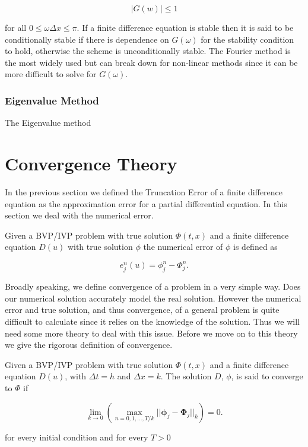 \documentclass[../main.tex]{subfiles}
\begin{document}
  \begin{equation}
    \left\vert G(w) \right\vert \leq 1
  \end{equation}

  for all $0 \leq \omega \Delta x \leq \pi$. If a finite difference equation is stable then it is said to be conditionally stable if there is dependence on $G(\omega)$ for the stability condition to hold, otherwise the scheme is unconditionally stable. The Fourier method is the most widely used but can break down for non-linear methods since it can be more difficult to solve for $G(\omega)$.

  \subsubsection{Eigenvalue Method}
  The Eigenvalue method

  \section{Convergence Theory}
  In the previous section we defined the Truncation Error of a finite difference equation as the approximation error for a partial differential equation. In this section we deal with the numerical error.

  \begin{definition}
    Given a BVP/IVP problem with true solution $\Phi(t, x)$ and a finite difference equation $D(u)$ with true solution $\phi$ the numerical error of $\phi$ is defined as

    \begin{equation}
      e^n_j(u) = \phi^n_j - \Phi^n_j.
    \end{equation}
  \end{definition}

  Broadly speaking, we define convergence of a problem in a very simple way. Does our numerical solution accurately model the real solution. However the numerical error and true solution, and thus convergence, of a general problem is quite difficult to calculate since it relies on the knowledge of the solution. Thus we will need some more theory to deal with this issue. Before we move on to this theory we give the rigorous definition of convergence.

  \begin{definition}[Convergence]
    Given a BVP/IVP problem with true solution $\Phi(t, x)$ and a finite difference equation $D(u)$, with $\Delta t = h$ and $\Delta x = k$. The solution $D$, $\phi$, is said to converge to $\Phi$ if

    \begin{equation}
      \lim_{k \to 0} \left( \max_{n = 0, 1, ..., T / k} || \boldsymbol\phi_j - \boldsymbol\Phi_j ||_k \right) = 0.
    \end{equation}

    for every initial condition and for every $T > 0$
  \end{definition}
\end{document}
